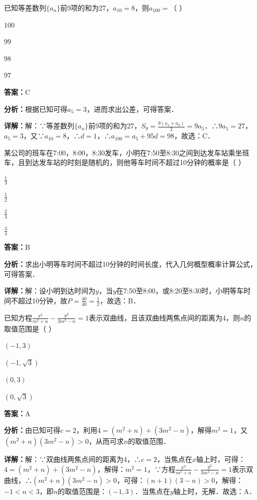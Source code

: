 \begin{question}[points=5]
已知等差数列$\{a_n\}$前9项的和为27，$a_{10}=8$，则$a_{100}=$（ ）
\begin{choices}
  \item $100$
  \item $99$
  \item $98$
  \item $97$
\end{choices}
\begin{solution}
\textbf{答案：}C

\textbf{分析：}根据已知可得$a_5=3$，进而求出公差，可得答案．

\textbf{详解：}解：∵等差数列$\{a_n\}$前9项的和为27，$S_9=\frac{9(a_1+a_9)}{2}=9a_5$．∴$9a_5=27$，$a_5=3$，又∵$a_{10}=8$，∴$d=1$，∴$a_{100}=a_5+95d=98$，故选：C．
\end{solution}
\end{question}

\begin{question}[points=5]
某公司的班车在7:00，8:00，8:30发车，小明在7:50至8:30之间到达发车站乘坐班车，且到达发车站的时刻是随机的，则他等车时间不超过10分钟的概率是（ ）
\begin{choices}
  \item $\frac{1}{3}$
  \item $\frac{1}{2}$
  \item $\frac{2}{3}$
  \item $\frac{3}{4}$
\end{choices}
\begin{solution}
\textbf{答案：}B

\textbf{分析：}求出小明等车时间不超过10分钟的时间长度，代入几何概型概率计算公式，可得答案．

\textbf{详解：}解：设小明到达时间为$y$，当$y$在7:50至8:00，或8:20至8:30时，小明等车时间不超过10分钟，故$P=\frac{40}{40}=\frac{1}{2}$，故选：B．
\end{solution}
\end{question}

\begin{question}[points=5]
已知方程$\frac{x^2}{m^2+n}-\frac{y^2}{3m^2-n}=1$表示双曲线，且该双曲线两焦点间的距离为4，则$n$的取值范围是（ ）
\begin{choices}
  \item $(-1,3)$
  \item $(-1,\sqrt{3})$
  \item $(0,3)$
  \item $(0,\sqrt{3})$
\end{choices}
\begin{solution}
\textbf{答案：}A

\textbf{分析：}由已知可得$c=2$，利用$4=(m^2+n)+(3m^2-n)$，解得$m^2=1$，又$(m^2+n)(3m^2-n)>0$，从而可求$n$的取值范围．

\textbf{详解：}解：∵双曲线两焦点间的距离为4，∴$c=2$，当焦点在$x$轴上时，可得：$4=(m^2+n)+(3m^2-n)$，解得：$m^2=1$，∵方程$\frac{x^2}{m^2+n}-\frac{y^2}{3m^2-n}=1$表示双曲线，∴$(m^2+n)(3m^2-n)>0$，可得：$(n+1)(3-n)>0$，解得：$-1<n<3$，即$n$的取值范围是：$(-1,3)$．当焦点在$y$轴上时，无解．故选：A．
\end{solution}
\end{question}

